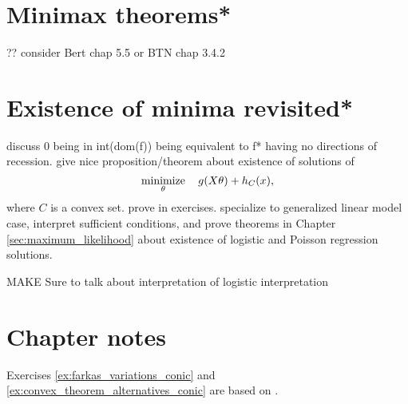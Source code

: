 \section{Minimax theorems*}
\label{sec:minimax_theorems}

?? consider Bert chap 5.5 or BTN chap 3.4.2 

\section{Existence of minima revisited*}
\label{sec:existence_minima_revisited}

discuss 0 being in int(dom(f)) being equivalent to f* having no directions
of recession.  give nice proposition/theorem about existence of solutions of 
$$
\operatorname*{minimize}_\theta \quad g(X \theta) + h_C(x),
$$
where $C$ is a convex set. prove in exercises. specialize to generalized linear
model case, interpret sufficient conditions, and prove theorems in Chapter
\ref{sec:maximum_likelihood} about existence of logistic and Poisson regression
solutions. 

MAKE Sure to talk about interpretation of logistic interpretation

\SkipTocEntry\section*{Chapter notes}

Exercises \ref{ex:farkas_variations_conic} and
\ref{ex:convex_theorem_alternatives_conic} are based on \cite{bental2023convex}.           

